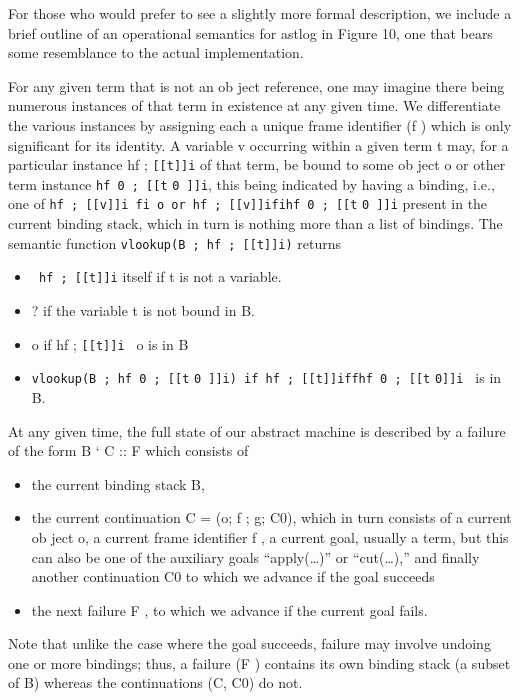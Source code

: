 
For those who would prefer to see a slightly more formal
description, we include a brief outline of an operational
semantics for astlog in Figure 10, one that
bears some resemblance to the actual implementation.

For any given term that is not an ob ject reference,
one may imagine there being numerous instances of
that term in existence at any given time. We differentiate
the various instances by assigning each a unique
frame identifier (f ) which is only significant for its
identity. A variable v occurring within a given term t
may, for a particular instance hf ; \verb|[[t]]i| of that term,
be bound to some ob ject o or other term instance
\verb|hf 0 ; [[t|
\verb|0 ]]i|, this being indicated by having a binding,
i.e., one of \verb|hf ; [[v]]i fi o or hf ; [[v]]ifihf 0 ; [[t|
\verb|0 ]]i| present
in the current binding stack, which in turn is nothing
more than a list of bindings. The semantic function
\verb|vlookup(B ; hf ; [[t]]i)| returns
\begin{itemize}
  \item 
\verb| hf ; [[t]]i| itself if t is not a variable. 
  \item 
 ? if the variable t is not bound in B. 
  \item 
 o if hf ; \verb|[[t]]i | o is in B
  \item 
 \verb|vlookup(B ; hf 0 ; [[t|
\verb|0 ]]i) if hf ; [[t]]iffhf 0 ; [[t|
\verb|0]]i | is in B.
 \end{itemize}
 
 At any given time, the full state of our abstract machine
is described by a failure of the form B ` C :: F
which consists of

\begin{itemize}
  \item the current binding stack B,
  \item the current continuation C = (o; f ; g; C0), which
in turn consists of a current ob ject o, a current
frame identifier f , a current goal, usually a term,
but this can also be one of the auxiliary goals
``apply(\ldots)'' or ``cut(\ldots),'' and finally another
continuation C0 to which we advance if the goal
succeeds
\item the next failure F , to which we advance if the
current goal fails.
\end{itemize}

Note that unlike the case where the goal succeeds, failure
may involve undoing one or more bindings; thus,
a failure (F ) contains its own binding stack (a subset
of B) whereas the continuations (C, C0) do not.


